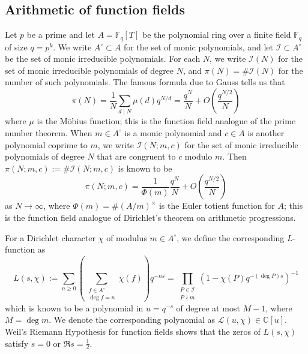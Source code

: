 \documentclass[10pt,reqno]{amsproc}
\newcommand{\bC}{\mathbb{C}}
\newcommand{\bF}{\mathbb{F}}
\newcommand{\cI}{\mathcal{I}}
\newcommand{\cL}{\mathcal{L}}
\newcommand{\1}{\mathds{1}}	%
\theoremstyle{definition}
\theoremstyle{remark}
\begin{document}
\subsection{Arithmetic of function fields}
\label{subsec:prelim_arith}


Let $p$ be a prime and let $A = \bF_q[T]$ be the polynomial ring over a finite field $\bF_q$ of size $q = p^k$.
We write $A^\circ \subset A$ for the set of monic polynomials, and let $\cI \subset A^\circ$ be the set of monic irreducible polynomials.
For each $N$, we write $\cI(N)$ for the set of monic irreducible polynomials of degree $N$, and $\pi(N) = \# \cI(N)$ for the number of such polynomials.
The famous formula due to Gauss tells us that
\begin{equation}
\label{eqn:gauss_cnt}    
\pi(N) = \frac{1}{N} \sum_{d \mid N} \mu(d) q^{N / d} = \frac{q^N}{N} + O\left(\frac{q^{N/2}}{N}\right)
\end{equation}
where $\mu$ is the M\"obius function; this is the function field analogue of the prime number theorem.
When $m \in A^\circ$ is a monic polynomial and $c \in A$ is another polynomial coprime to $m$, we write $\cI(N; m, c)$ for the set of monic irreducible polynomials of degree $N$ that are congruent to $c$ modulo $m$.
Then $\pi(N; m, c) := \# \cI(N; m, c)$ is known to be
\begin{equation}
\label{eqn:dirichlet_cnt}    
\pi(N; m, c) = \frac{1}{\Phi(m)} \frac{q^N}{N} + O\left(\frac{q^{N/2}}{N}\right)
\end{equation}
as $N \to \infty$, where $\Phi(m) = \# (A / m)^\times$ is the Euler totient function for $A$; this is the function field analogue of Dirichlet's theorem on arithmetic progressions.

For a Dirichlet character $\chi$ of modulus $m \in A^\circ$, we define the corresponding $L$-function as
\begin{equation}
\label{eqn:Lchi_euler}
    L(s, \chi) :=  \sum_{n \ge 0} \left(\sum_{\substack{f \in A^\circ \\ \deg f = n}}\chi(f)\right) q^{-ns} = \prod_{\substack{P \in \cI \\ P \nmid m}} (1 - \chi(P)q^{-(\deg P)s})^{-1}
\end{equation}
which is known to be a polynomial in $u = q^{-s}$ of degree at most $M - 1$, where $M = \deg m$.
We denote the corresponding polynomial as $\cL(u, \chi) \in \bC[u]$.
Weil's Riemann Hypothesis for function fields shows that the zeros of $L(s, \chi)$ satisfy $s = 0$ or $\Re s = \frac{1}{2}$.
\end{document}
